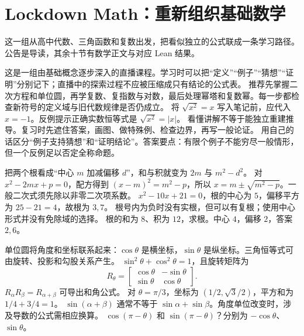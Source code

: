 \chapter{Lockdown Math：重新组织基础数学}
这一组从高中代数、三角函数和复数出发，把看似独立的公式联成一条学习路径。公告是导读，其余十节有数学正文与对应 Lean 结果。

\idea 这是一组由基础概念逐步深入的直播课程。学习时可以把“定义”“例子”“猜想”“证明”分别记下；直播中的探索过程不应被压缩成只有结论的公式表。
\mathpart 推荐先掌握二次方程和单位圆，再学复数、复指数与对数，最后处理幂塔和复数幂。每一步都检查新符号的定义域与旧代数规律是否仍成立。
\examplepart 将 $\sqrt{x^2}=x$ 写入笔记前，应代入 $x=-1$。反例提示正确实数恒等式是 $\sqrt{x^2}=|x|$。
\pitfall 看懂讲解不等于能独立重建推导。复习时先遮住答案，画图、做特殊例、检查边界，再写一般论证。
\exercise 用自己的话区分“例子支持猜想”和“证明结论”。答案要点：有限个例子不能穷尽一般情形，但一个反例足以否定全称命题。
\nextlesson

\idea 把两个根看成“中心 $m$ 加减偏移 $d$”，和与积就变为 $2m$ 与 $m^2-d^2$。
\mathpart 对 $x^2-2mx+p=0$，配方得到 $(x-m)^2=m^2-p$，所以 $x=m\pm\sqrt{m^2-p}$。一般二次式须先除以非零二次项系数。
\examplepart $x^2-10x+21=0$，根的中心为 $5$，偏移平方为 $25-21=4$，故根为 $3,7$。
\pitfall 根号内为负时没有实根，但可以有复根；使用中心形式并没有免除域的选择。
\exercise 根的和为 $8$、积为 $12$，求根。中心 $4$，偏移 $2$，答案 $2,6$。
\nextlesson

\idea 单位圆将角度和坐标联系起来：$\cos\theta$ 是横坐标，$\sin\theta$ 是纵坐标。三角恒等式可由旋转、投影和勾股关系产生。
\mathpart $\sin^2\theta+\cos^2\theta=1$，且旋转矩阵为
\[R_\theta=\begin{bmatrix}\cos\theta&-\sin\theta\\\sin\theta&\cos\theta\end{bmatrix}.\]
$R_\alpha R_\beta=R_{\alpha+\beta}$ 可导出和角公式。
\examplepart 对 $\theta=\pi/3$，坐标为 $(1/2,\sqrt3/2)$，平方和为 $1/4+3/4=1$。
\pitfall $\sin(\alpha+\beta)$ 通常不等于 $\sin\alpha+\sin\beta$。角度单位改变时，涉及导数的公式需相应换算。
\exercise $\cos(\pi-\theta)$ 和 $\sin(\pi-\theta)$？分别为 $-\cos\theta$、$\sin\theta$。
\nextlesson

